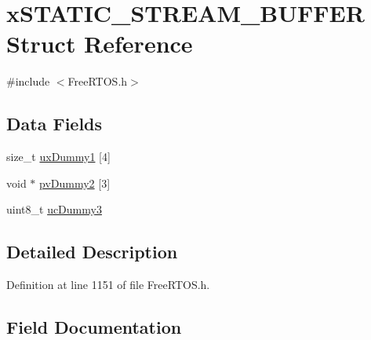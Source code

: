 \hypertarget{structx_s_t_a_t_i_c___s_t_r_e_a_m___b_u_f_f_e_r}{}\section{x\+S\+T\+A\+T\+I\+C\+\_\+\+S\+T\+R\+E\+A\+M\+\_\+\+B\+U\+F\+F\+ER Struct Reference}
\label{structx_s_t_a_t_i_c___s_t_r_e_a_m___b_u_f_f_e_r}


{\ttfamily \#include $<$Free\+R\+T\+O\+S.\+h$>$}

\subsection*{Data Fields}
\begin{DoxyCompactItemize}
\item 
size\+\_\+t \hyperlink{structx_s_t_a_t_i_c___s_t_r_e_a_m___b_u_f_f_e_r_a9020496ea46d0d95451ed11b3193fa09}{ux\+Dummy1} \mbox{[}4\mbox{]}
\item 
void $\ast$ \hyperlink{structx_s_t_a_t_i_c___s_t_r_e_a_m___b_u_f_f_e_r_a7603bb483828c39906839c90c4e70fe9}{pv\+Dummy2} \mbox{[}3\mbox{]}
\item 
uint8\+\_\+t \hyperlink{structx_s_t_a_t_i_c___s_t_r_e_a_m___b_u_f_f_e_r_a7a6df8a6f408f01b245c0c90732dea72}{uc\+Dummy3}
\end{DoxyCompactItemize}


\subsection{Detailed Description}


Definition at line 1151 of file Free\+R\+T\+O\+S.\+h.



\subsection{Field Documentation}
\mbox{\label{structx_s_t_a_t_i_c___s_t_r_e_a_m___b_u_f_f_e_r_a7603bb483828c39906839c90c4e70fe9}} 

